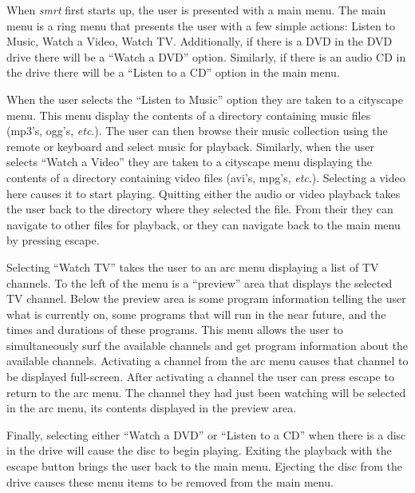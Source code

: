 \documentclass[letterpaper, titlepage, 11pt]{article}
\begin{document}
When \textit{smrt} first starts up, the user is presented with a main menu.
The main menu is a ring menu that presents the user with a few simple actions:
Listen to Music, Watch a Video, Watch TV. Additionally, if there is a DVD in the
DVD drive there will be a ``Watch a DVD'' option. Similarly, if there is an
audio CD in the drive there will be a ``Listen to a CD'' option in the main
menu.

When the user selects the ``Listen to Music'' option they are taken to a
cityscape menu. This menu display the contents of a directory containing music
files (mp3's, ogg's, \textit{etc}.). The user can then browse their music
collection using the remote or keyboard and select music for playback.
Similarly, when the user selects ``Watch a Video'' they are taken to a cityscape
menu displaying the contents of a directory containing video files (avi's,
mpg's, \textit{etc}.). Selecting a video here causes it to start playing.
Quitting either the audio or video playback takes the user back to the directory
where they selected the file. From their they can navigate to other files for
playback, or they can navigate back to the main menu by pressing escape.

Selecting ``Watch TV'' takes the user to an arc menu displaying a list of TV
channels. To the left of the menu is a ``preview'' area that displays the
selected TV channel.  Below the preview area is some program information telling
the user what is currently on, some programs that will run in the near future,
and the times and durations of these programs. This menu allows the user to
simultaneously surf the available channels and get program information about the
available channels. Activating a channel from the arc menu causes that channel to
be displayed full-screen. After activating a channel the user can press escape to
return to the arc menu. The channel they had just been watching will be
selected in the arc menu, its contents displayed in the preview area.

Finally, selecting either ``Watch a DVD'' or ``Listen to a CD'' when there is a
disc in the drive will cause the disc to begin playing. Exiting the playback
with the escape button brings the user back to the main menu. Ejecting the disc
from the drive causes these menu items to be removed from the main menu.

\end{document}
